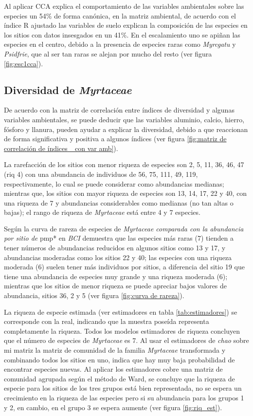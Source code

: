 \documentclass[11pt,]{article}
\begin{document}
Al aplicar CCA explica el comportamiento de las variables ambientales
sobre las especies un 54\% de forma canónica, en la matriz ambiental, de
acuerdo con el índice R ajustado las variables de suelo explican la
composición de las especies en los sitios con datos insesgados en un
41\%. En el escalamiento uno se apiñan las especies en el centro, debido
a la presencia de especies raras como \emph{Myrcgatu} y \emph{Psidfrie},
que al ser tan raras se alejan por mucho del resto (ver figura
\ref{fig:esc1cca}).

\subsection{\texorpdfstring{Diversidad de
\emph{Myrtaceae}}{Diversidad de Myrtaceae}}\label{diversidad-de-myrtaceae}

De acuerdo con la matriz de correlación entre índices de diversidad y
algunas variables ambientales, se puede deducir que las variables
aluminio, calcio, hierro, fósforo y llanura, pueden ayudar a explicar la
diversidad, debido a que reaccionan de forma significativa y positiva a
algunos índices (ver figura
\ref{fig:matriz de correlación de índices _con var amb}).

La rarefacción de los sitios con menor riqueza de especies son 2, 5, 11,
36, 46, 47 (riq 4) con una abundancia de individuos de 56, 75, 111, 49,
119, respectivamente, lo cual se puede considerar como abundancias
medianas; mientras que, los sitios con mayor riqueza de especies son 13,
14, 17, 22 y 40, con una riqueza de 7 y abundancias considerables como
medianas (no tan altas o bajas); el rango de riqueza de \emph{Myrtaceae}
está entre 4 y 7 especies.

Según la curva de rareza de especies de \emph{Myrtaceae comparada con la
abundancia por sitio de }pmp* en \emph{BCI} demuestra que las especies
más raras (7) tienden a tener números de abundancias reducidos en
algunos sitios como 13 y 17, y abundancias moderadas como los sitios 22
y 40; las especies con una riqueza moderada (6) suelen tener más
individuos por sitios, a diferencia del sitio 19 que tiene una
abundancia de especies muy grande y una riqueza moderada (6); mientras
que los sitios de menor riqueza se puede apreciar bajos valores de
abundancia, sitios 36, 2 y 5 (ver figura \ref{fig:curva de rareza}).

La riqueza de especie estimada (ver estimadores en tabla
\ref{tab:estimadores}) se corresponde con la real, indicando que la
muestra poseída representa completamente la riqueza. Todos los modelos
estimadores de riqueza concluyen que el número de especies de
\emph{Myrtaceae} es 7. Al usar el estimadores de \emph{chao} sobre mi
matriz la matriz de comunidad de la familia \emph{Myrtaceae}
transformada y combinando todos los sitios en uno, indica que hay muy
baja probabilidad de encontrar especies nuevas. Al aplicar los
estimadores cobre una matriz de comunidad agrupada según el método de
Ward, se concluye que la riqueza de especie para los sitios de los tres
grupos está bien representada, no se espera un crecimiento en la riqueza
de las especies pero si su abundancia para los grupos 1 y 2, en cambio,
en el grupo 3 se espera aumente (ver figura \ref{fig:riq_est}).
\end{document}
